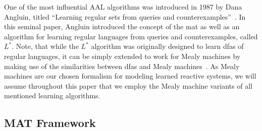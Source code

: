 One of the most influential AAL algorithms was introduced in 1987 by Dana Angluin, titled ``Learning regular sets from queries and counterexamples''~\cite{ANGLUIN198787}. In this seminal paper, Angluin introduced the concept of the \ac{mat} as well as an algorithm for learning regular languages from queries and counterexamples, called $L^*$. Note, that while the $L^*$ algorithm was originally designed to learn \acp{dfa} of regular languages, it can be simply extended to work for Mealy machines by making use of the similarities between \acp{dfa} and Mealy machines~\cite{hungar2003domain, shahbaz2009inferring}. As Mealy machines are our chosen formalism for modeling learned reactive systems, we will assume throughout this paper that we employ the Mealy machine variants of all mentioned learning algorithms. 

\subsection{MAT Framework}

